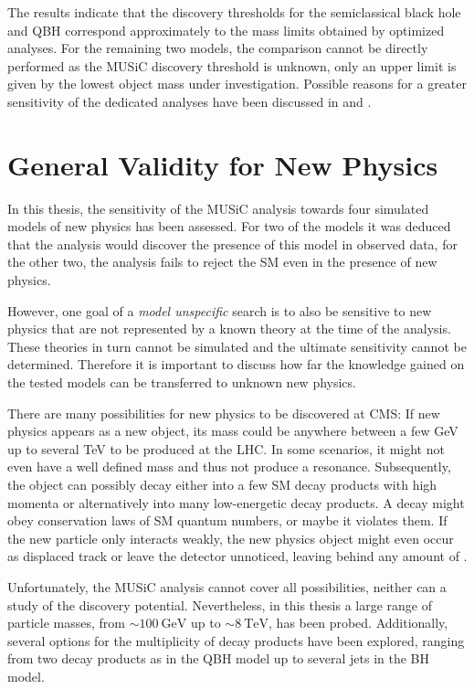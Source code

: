 The results indicate that the discovery thresholds for the semiclassical black hole and \ac{QBH} correspond approximately to the mass limits obtained by optimized analyses. For the remaining two models, the comparison cannot be directly performed as the \ac{MUSiC} discovery threshold is unknown, only an upper limit is given by the lowest object mass under investigation. Possible reasons for a greater sensitivity of the dedicated analyses have been discussed in  and .

\section{General Validity for New Physics}
In this thesis, the sensitivity of the \ac{MUSiC} analysis towards four simulated models of new physics has been assessed. For two of the models it was deduced that the analysis would discover the presence of this model in observed data, for the other two, the analysis fails to reject the \acl{SM} even in the presence of new physics. 

However, one goal of a \emph{model unspecific} search is to also be sensitive to new physics that are not represented by a known theory at the time of the analysis. These theories in turn cannot be simulated and the ultimate sensitivity cannot be determined.
Therefore it is important to discuss how far the knowledge gained on the tested models can be transferred to unknown new physics.

There are many possibilities for new physics to be discovered at \ac{CMS}: If new physics appears as a new object, its mass could be anywhere between a few \si{\GeV} up to several \si{\TeV} to be produced at the \ac{LHC}. In some scenarios, it might not even have a well defined mass and thus not produce a resonance. Subsequently, the object can possibly decay either into a few \ac{SM} decay products with high momenta or alternatively into many low-energetic decay products. A decay might obey conservation laws of \ac{SM} quantum numbers, or maybe it violates them. If the new particle only interacts weakly, the new physics object might even occur as displaced track or leave the detector unnoticed, leaving behind any amount of \MET.

Unfortunately, the \ac{MUSiC} analysis cannot cover all possibilities, neither can a study of the discovery potential.
Nevertheless, in this thesis a large range of particle masses, from $\sim \SI{100}{\GeV}$ up to $\sim \SI{8}{\TeV}$, has been probed. Additionally, several options for the multiplicity of decay products have been explored, ranging from two decay products as in the \ac{QBH} model up to several jets in the \ac{BH} model. 

